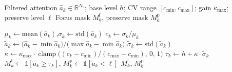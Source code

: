 \begin{algorithm}[t]
\caption{Instance-Adaptive Mask Binarization}
\label{alg:adaptive_threshold}
\small
\begin{algorithmic}[1]
\Require Filtered attention $\hat{a}_k \in \mathbb{R}^{N_v}$; base level $h$;
         CV range $[c_{\min}, c_{\max}]$; gain $\kappa_{\max}$; preserve level $\ell$
\Ensure Focus mask $M_k^{\mathrm{f}}$, preserve mask $M_k^{\mathrm{p}}$

\State $\mu_k \gets \mathrm{mean}(\hat{a}_k)$,\quad $\sigma_k \gets \mathrm{std}(\hat{a}_k)$
\State $c_k \gets \sigma_k / \mu_k$ 
\State $\tilde{a}_k \gets \bigl(\hat{a}_k - \min \hat{a}_k\bigr) / \bigl(\max \hat{a}_k - \min \hat{a}_k\bigr)$
\State $\tilde{\sigma}_k \gets \mathrm{std}(\tilde{a}_k)$
\State $\kappa \gets \kappa_{\max}\cdot\operatorname{clamp}\!\bigl((c_k - c_{\min})/(c_{\max} - c_{\min}),\,0,\,1\bigr)$
\State $\tau_k \gets h + \kappa \cdot \tilde{\sigma}_k$ 
\State $M_k^{\mathrm{f}} \gets \mathbb{1}[\tilde{a}_k \ge \tau_k]$,\quad
       $M_k^{\mathrm{p}} \gets \mathbb{1}[\tilde{a}_k < \ell]$
\State \Return $M_k^{\mathrm{f}},\, M_k^{\mathrm{p}}$
\end{algorithmic}
\end{algorithm}
